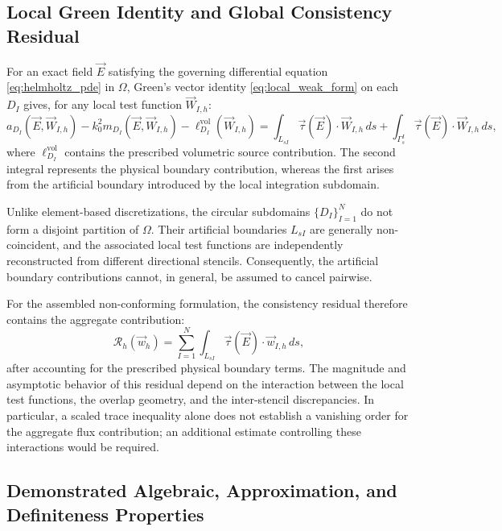\documentclass[VANCOUVER]{USG}
\begin{document}
\subsection{Local Green Identity and Global Consistency Residual}
\label{subsubsec:consistency_residual}

For an exact field $\vec{E}$ satisfying the governing differential equation \eqref{eq:helmholtz_pde} in $\Omega$, Green's vector identity \eqref{eq:local_weak_form} on each $D_I$ gives, for any local test function $\vec{W}_{I,h}$:
\begin{equation}
    a_{D_I}(\vec{E}, \vec{W}_{I,h}) - k_0^2 m_{D_I}(\vec{E}, \vec{W}_{I,h}) - \ell_{D_I}^{\mathrm{vol}}(\vec{W}_{I,h}) = \int_{L_{sI}} \vec{\tau}(\vec{E}) \cdot \vec{W}_{I,h} \, ds + \int_{\Gamma_s^I} \vec{\tau}(\vec{E}) \cdot \vec{W}_{I,h} \, ds,
    \label{eq:local_green_flux_balance}
\end{equation}
where $\ell_{D_I}^{\mathrm{vol}}$ contains the prescribed volumetric source contribution. The second integral represents the physical boundary contribution, whereas the first arises from the artificial boundary introduced by the local integration subdomain.

Unlike element-based discretizations, the circular subdomains $\{D_I\}_{I=1}^N$ do not form a disjoint partition of $\Omega$. Their artificial boundaries $L_{sI}$ are generally non-coincident, and the associated local test functions are independently reconstructed from different directional stencils. Consequently, the artificial boundary contributions cannot, in general, be assumed to cancel pairwise.

For the assembled non-conforming formulation, the consistency residual therefore contains the aggregate contribution:
\begin{equation}
    \mathcal{R}_h(\vec{w}_h) = \sum_{I=1}^N \int_{L_{sI}} \vec{\tau}(\vec{E}) \cdot \vec{w}_{I,h} \, ds,
    \label{eq:global_consistency_residual}
\end{equation}
after accounting for the prescribed physical boundary terms. The magnitude and asymptotic behavior of this residual depend on the interaction between the local test functions, the overlap geometry, and the inter-stencil discrepancies. In particular, a scaled trace inequality alone does not establish a vanishing order for the aggregate flux contribution; an additional estimate controlling these interactions would be required.

\subsection{Demonstrated Algebraic, Approximation, and Definiteness Properties}
\label{subsubsec:demonstrated_properties}
\end{document}
